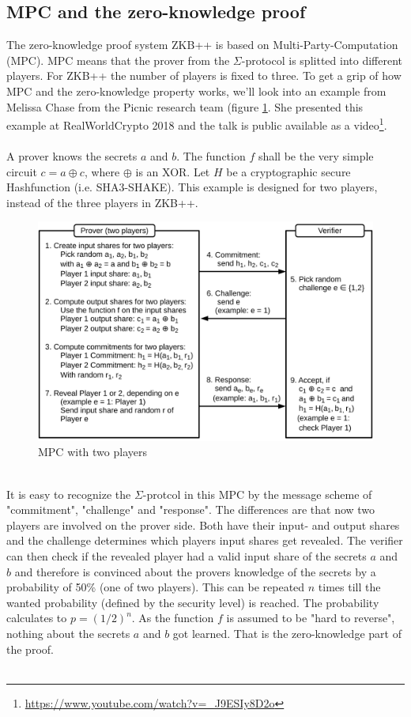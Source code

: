 \documentclass[]{article}
\begin{document}
\subsection{MPC and the zero-knowledge proof} 
The zero-knowledge proof system ZKB++ is based on Multi-Party-Computation (MPC). MPC means that the prover from the $\Sigma$-protocol is splitted into different players. For ZKB++ the number of players is fixed to three. To get a grip of how MPC and the zero-knowledge property works, we'll look into an example from Melissa Chase from the Picnic research team (figure \ref{fig:mpc}. She presented this example at RealWorldCrypto 2018 and the talk is public available as a video\footnote{\url{https://www.youtube.com/watch?v=_J9ESIy8D2o}}.\\ \\
A prover knows the secrets $a$ and $b$. The function $f$ shall be the very simple circuit $c=a\oplus c$, where $\oplus$ is an XOR. Let $H$ be a cryptographic secure Hashfunction (i.e. SHA3-SHAKE). This example is designed for two players, instead of the three players in ZKB++.\\
\begin{figure}[htbp]
\center
\includegraphics[width=1.0\textwidth]{pics/mpc2player.pdf}
\caption{MPC with two players}
\label{fig:mpc}
\end{figure}\\
It is easy to recognize the $\Sigma$-protcol in this MPC by the message scheme of "commitment", "challenge" and "response". The differences are that now two players are involved on the prover side. Both have their input- and output shares and the challenge determines which players input shares get revealed. The verifier can then check if the revealed player had a valid input share of the secrets $a$ and $b$ and therefore is convinced about the provers knowledge of the secrets by a probability of 50\% (one of two players). This can be repeated $n$ times till the wanted probability (defined by the security level) is reached. The probability calculates to $p = (1/2)^{n}$. As the function $f$ is assumed to be "hard to reverse", nothing about the secrets $a$ and $b$ got learned. That is the zero-knowledge part of the proof.\\ \\
\end{document}
